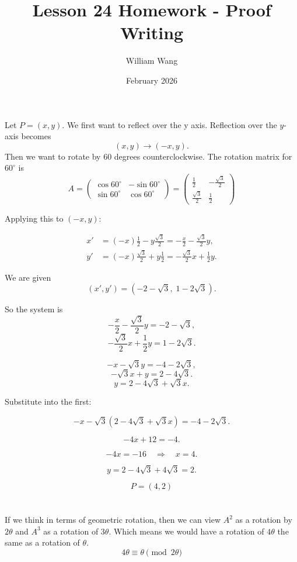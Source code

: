 \documentclass{article}
\title{Lesson 24 Homework - Proof Writing}
\author{William Wang}
\date{February 2026}
\begin{document}
\maketitle

\section{}


Let \(P=(x,y)\). We first want to reflect over the y axis. Reflection over the \(y\)-axis becomes
\[(x,y)\longrightarrow(-x,y).\]
Then we want to rotate by 60 degrees counterclockwise. The rotation matrix for \(60^\circ\) is
\[
A =
\begin{pmatrix}
\cos 60^\circ & -\sin 60^\circ \\
\sin 60^\circ & \cos 60^\circ
\end{pmatrix}=
\begin{pmatrix}\frac12 & -\frac{\sqrt3}{2} \\\frac{\sqrt3}{2} & \frac12\end{pmatrix}\]

Applying this to \((-x,y)\):

\[
\begin{aligned}
x' &= (-x)\frac12 - y\frac{\sqrt3}{2}
= -\frac{x}{2} - \frac{\sqrt3}{2}y, \\
y' &= (-x)\frac{\sqrt3}{2} + y\frac12
= -\frac{\sqrt3}{2}x + \frac12 y.
\end{aligned}
\]

We are given
\[
(x',y')=(-2-\sqrt3,\;1-2\sqrt3).
\]

So the system is
\[
-\frac{x}{2}-\frac{\sqrt3}{2}y=-2-\sqrt3,
\]
\[
-\frac{\sqrt3}{2}x+\frac12 y=1-2\sqrt3.
\]

\[
-x-\sqrt3 y=-4-2\sqrt3,
\]
\[
-\sqrt3 x+y=2-4\sqrt3.
\]
\[
y=2-4\sqrt3+\sqrt3 x.
\]

Substitute into the first:

\[
-x-\sqrt3(2-4\sqrt3+\sqrt3 x)=-4-2\sqrt3.
\]

\[
-4x+12=-4.
\]

\[
-4x=-16 \quad\Rightarrow\quad x=4.
\]

\[
y=2-4\sqrt3+4\sqrt3=2.
\]

\[
P=(4,2)
\]

\section{}
If we think in terms of geometric rotation, then we can view \(A^2\) as a rotation by \(2\theta\) and \(A^3\) as a rotation of \(3\theta\). Which means we would have a rotation of \(4\theta\) the same as a rotation of \(\theta\). 
\[4\theta \equiv \theta \pmod{2\theta}\]
\end{document}
